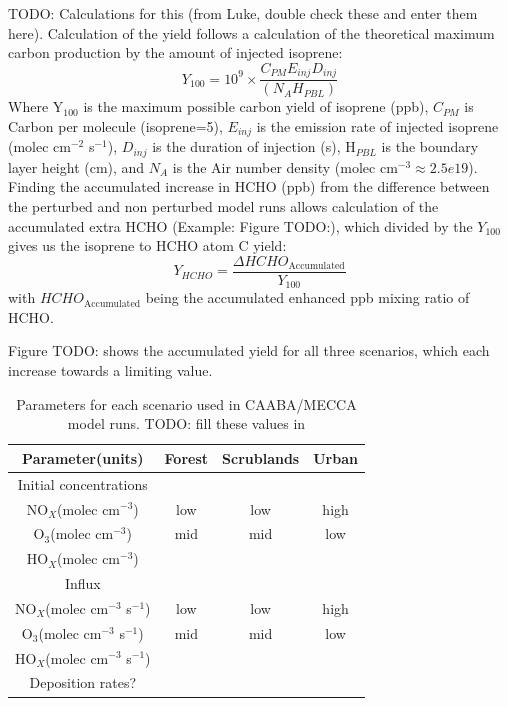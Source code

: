     TODO: Calculations for this (from Luke, double check these and enter them here).
    Calculation of the yield follows a calculation of the theoretical maximum carbon production by the amount of injected isoprene:
    \begin{equation}
    Y_{100} =10^9 \times \frac{C_{PM} E_{inj} D_{inj}}{(N_A H_{PBL})}
    \end{equation}
    Where Y$_{100}$ is the maximum possible carbon yield of isoprene (ppb), $C_{PM}$ is Carbon per molecule (isoprene=5), $E_{inj}$ is the emission rate of injected isoprene (molec cm$^{-2}$ s$^{-1}$), $D_{inj}$ is the duration of injection (s), H$_{PBL}$ is the boundary layer height (cm), and $N_A$ is the Air number density (molec cm$^{-3} \approx 2.5e19$).
    Finding the accumulated increase in HCHO (ppb) from the difference between the perturbed and non perturbed model runs allows calculation of the accumulated extra HCHO (Example: Figure TODO:), which divided by the $Y_{100}$ gives us the isoprene to HCHO atom C yield:
    \begin{equation}
    Y_{HCHO}= \frac{\Delta HCHO_{\text{Accumulated}}}{Y_{100}}
    \end{equation}
    with $HCHO_{\text{Accumulated}}$ being the accumulated enhanced ppb mixing ratio of HCHO.
    
    Figure TODO: shows the accumulated yield for all three scenarios, which each increase towards a limiting value.
    
    \begin{table}[t]
      \caption{Parameters for each scenario used in CAABA/MECCA model runs. TODO: fill these values in}
      \begin{tabular}{ c |  c   c   c  } 
        \hline
        Parameter(units) 		 & Forest & Scrublands & Urban\\
        \hline
        Initial concentrations & & & \\
        NO$_X$(molec cm$^{-3}$)		 & low  & low  & high \\
        O$_3$(molec cm$^{-3}$)  & mid & mid & low \\
        HO$_X$(molec cm$^{-3}$) & & & \\
        \hline 
        Influx & & & \\
        NO$_X$(molec cm$^{-3}$ s$^{-1}$)		 & low  & low  & high \\
        O$_3$(molec cm$^{-3}$ s$^{-1}$)  & mid & mid & low \\
        HO$_X$(molec cm$^{-3}$ s$^{-1}$) & & & \\
        \hline
        Deposition rates? & & & \\
        \hline
      \end{tabular}
      \label{BioIsop:table:CAABAMECCA_Scenarios}
    \end{table}
  
